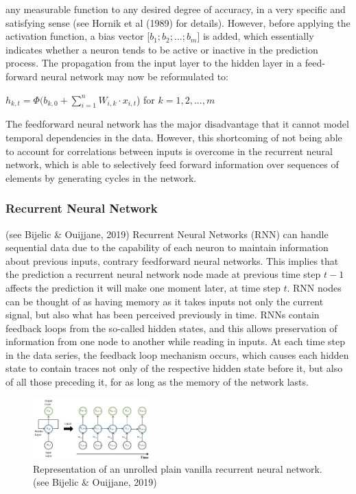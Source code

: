 \documentclass[a4paper,11pt,oneside]{book}
\begin{document}
any measurable function to any desired degree
of accuracy, in a very specific and satisfying
sense (see Hornik et al (1989) for details). However, before applying
the activation function, a bias vector [$b_{1};b_{2};...;b_{m}$] is added, which essentially
indicates whether a neuron tends to be active or inactive in the prediction process. The
propagation from the input layer to the hidden layer in a feed-forward neural
network may now be reformulated to:
 \begin{center}
	$h_{k,t} =\Phi(b_{k,0} +\sum_{i=1}^{n} W_{i,k} \cdot x_{i,t}$) for $k = 1,2,...,m$
\end{center}
The feedforward neural network has the major disadvantage that it cannot model temporal dependencies in the data. However, this shortcoming of not being able to account for correlations between inputs is overcome in the recurrent neural network, which is able to selectively feed forward information over sequences of elements by generating cycles in the network.
\subsubsection{Recurrent Neural Network} (see Bijelic \& Ouijjane, 2019)
Recurrent Neural Networks
(RNN) can handle sequential data due to the capability of each neuron to
maintain information about previous inputs, contrary feedforward neural networks. This implies that the prediction a recurrent
neural network node made at previous time step $t-1$ affects the prediction it will make one
moment later, at time step $t$. RNN nodes can be thought of as having memory as it takes inputs not only the current signal, but also
what has been perceived previously in time.\newline\newline
RNNs contain feedback loops from the so-called hidden states, and this allows preservation of information from one node to another while reading in inputs. At each time step in the data series, the feedback loop mechanism occurs, which causes each hidden state to contain traces not only of the respective hidden state before it, but also of all those preceding it, for as long as the memory of the network lasts.\newline
\begin{figure}[h]
	\centering
	\includegraphics[width=0.4\textwidth]{figures/RNN}
	\caption{Representation of an unrolled plain vanilla recurrent neural network. (see Bijelic \& Ouijjane, 2019)}
	
	\label{seventhfig}
\end{figure}
\end{document}
